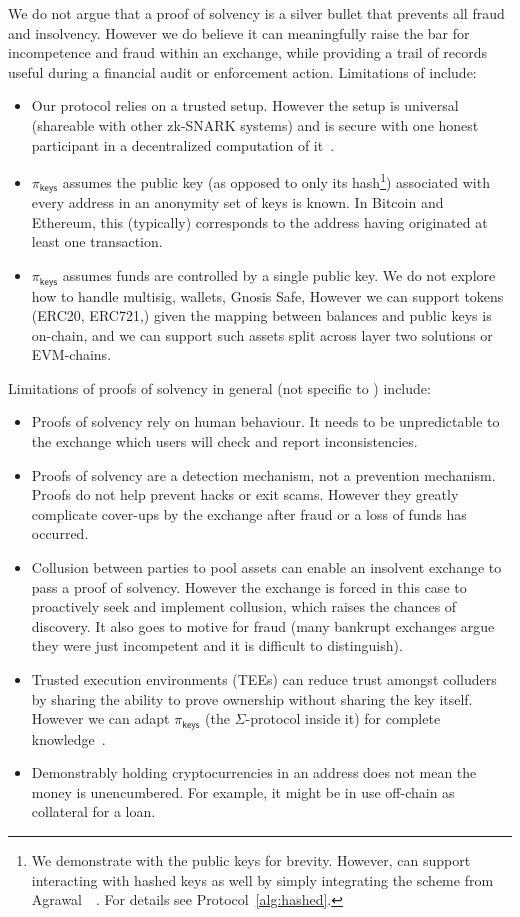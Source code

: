 We do not argue that a proof of solvency is a silver bullet that prevents all fraud and insolvency. However we do believe it can meaningfully raise the bar for incompetence and fraud within an exchange, while providing a trail of records useful during a financial audit or enforcement action. Limitations of \Sys include: 

\begin{itemize}
\item Our protocol relies on a trusted setup. However the setup is universal (shareable with other zk-SNARK systems) and is secure with one honest participant in a decentralized computation of it~\cite{tau}.
\item $\pi_\mathsf{keys}$ assumes the public key (as opposed to only its hash\footnote{We demonstrate \Sys with the public keys for brevity. However, \Sys can support interacting with hashed keys as well by simply integrating the scheme from Agrawal~\etal~\cite{composite}. For details see Protocol~\ref{alg:hashed}.}) associated with every address in an anonymity set of keys is known. In Bitcoin and Ethereum, this (typically) corresponds to the address having originated at least one transaction.
\item $\pi_\mathsf{keys}$ assumes funds are controlled by a single public key. We do not explore how to handle multisig, wallets, Gnosis Safe, \etc However we can support tokens (\eg ERC20, ERC721,\etc) given the mapping between balances and public keys is on-chain, and we can support such assets split across layer two solutions or EVM-chains. 
\end{itemize}

Limitations of proofs of solvency in general (not specific to \Sys) include:

\begin{itemize}
\item Proofs of solvency rely on human behaviour. It needs to be unpredictable to the exchange which users will check and report inconsistencies.
\item Proofs of solvency are a detection mechanism, not a prevention mechanism. Proofs do not help prevent hacks or exit scams. However they greatly complicate cover-ups by the exchange after fraud or a loss of funds has occurred.
\item Collusion between parties to pool assets can enable an insolvent exchange to pass a proof of solvency. However the exchange is forced in this case to proactively seek and implement collusion, which raises the chances of discovery. It also goes to motive for fraud (many bankrupt exchanges argue they were just incompetent and it is difficult to distinguish). 
\item Trusted execution environments (TEEs) can reduce trust amongst colluders by sharing the ability to prove ownership without sharing the key itself. However we can adapt $\pi_\mathsf{keys}$ (the $\Sigma$-protocol inside it) for complete knowledge~\cite{completeknowledge}.
\item Demonstrably holding cryptocurrencies in an address does not mean the money is unencumbered. For example, it might be in use off-chain as collateral for a loan. 
\end{itemize}

